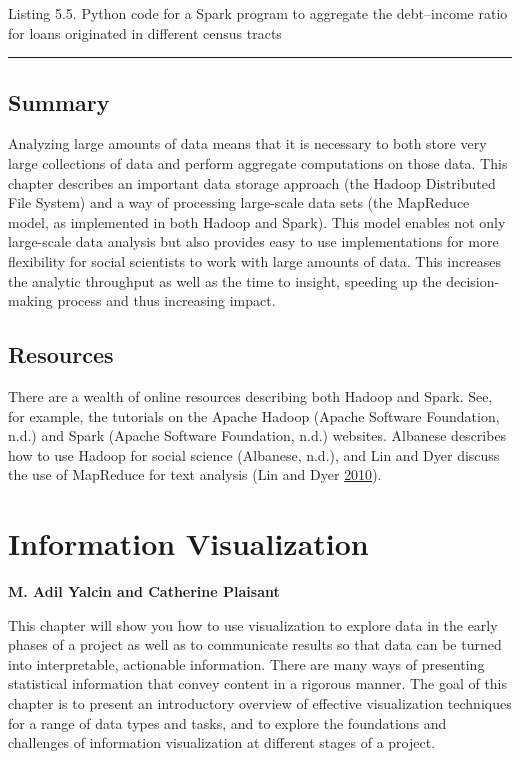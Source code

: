 \documentclass[]{krantz}
\begin{document}
Listing 5.5. Python code for a Spark program to aggregate the
debt--income ratio for loans originated in different census tracts

\begin{center}\rule{0.5\linewidth}{\linethickness}\end{center}

\section{Summary}\label{summary-2}

Analyzing large amounts of data means that it is necessary to both store
very large collections of data and perform aggregate computations on
those data. This chapter describes an important data storage approach
(the Hadoop Distributed File System) and a way of processing large-scale
data sets (the MapReduce model, as implemented in both Hadoop and
Spark). This model enables not only large-scale data analysis but also
provides easy to use implementations for more flexibility for social
scientists to work with large amounts of data. This increases the
analytic throughput as well as the time to insight, speeding up the
decision-making process and thus increasing impact.

\section{Resources}\label{resources-2}

There are a wealth of online resources describing both Hadoop and Spark.
See, for example, the tutorials on the Apache Hadoop (Apache Software
Foundation, n.d.) and Spark (Apache Software Foundation, n.d.) websites.
Albanese describes how to use Hadoop for social science (Albanese,
n.d.), and Lin and Dyer discuss the use of MapReduce for text analysis
(Lin and Dyer \protect\hyperlink{ref-lin2010data}{2010}).

\hypertarget{chap:viz}{\chapter{Information
Visualization}\label{chap:viz}}

\textbf{M. Adil Yalcin and Catherine Plaisant}

This chapter will show you how to use visualization to explore data in
the early phases of a project as well as to communicate results so that
data can be turned into interpretable, actionable information. There are
many ways of presenting statistical information that convey content in a
rigorous manner. The goal of this chapter is to present an introductory
overview of effective visualization techniques for a range of data types
and tasks, and to explore the foundations and challenges of information
visualization at different stages of a project.
\end{document}
